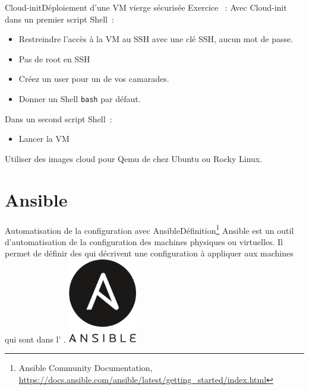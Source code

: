 \documentclass{beamer}
\begin{document}
    \begin{frame}{Cloud-init}{Déploiement d'une VM vierge sécurisée}
        Exercice \execcounterdispinc{}~:
        Avec Cloud-init dans un premier script Shell~:
        \begin{itemize}
            \item Restreindre l'accès à la VM au SSH avec une clé SSH, aucun mot de passe.
            \item Pas de root en SSH
            \item Créez un user pour un de vos camarades.
            \item Donner un Shell \lstinline{bash} par défaut.
        \end{itemize}
        Dans un second script Shell~:
        \begin{itemize}
            \item Lancer la VM
        \end{itemize}
        Utiliser des images cloud pour Qemu de chez Ubuntu ou Rocky Linux.
    \end{frame}


    \section{Ansible}\label{sec:ansible}

    \begin{frame}{Automatisation de la configuration avec Ansible}{Définition\footnote{Ansible Community Documentation, \url{https://docs.ansible.com/ansible/latest/getting_started/index.html}}}
        Ansible est un outil d'automatisation de la configuration des machines physiques ou virtuelles.
        Il permet de définir des  qui décrivent une configuration à appliquer aux machines qui sont dans l' .
        \bigbreak
        \centering
        \includegraphics[width=3cm]{image/logo-ansible}
    \end{frame}
\end{document}
